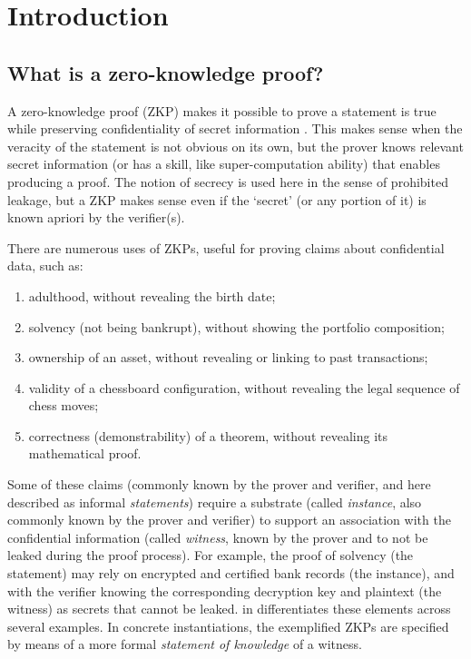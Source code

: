 \section{Introduction}
\label{security:intro}

\subsection{What is a zero-knowledge proof?}
\label{security:intro:what-is-a-ZK}

A zero-knowledge proof (ZKP) makes it possible to prove a statement is true while preserving confidentiality of secret information \cite{1985:GMR:STOC:the-knowledge-complexity-of-interactive-proof-systems}.
This makes sense when the veracity of the statement is not obvious on its own, but the prover knows relevant secret information (or has a skill, like super-computation ability) that enables producing a proof.
The notion of secrecy is used here in the sense of prohibited leakage, but a ZKP makes sense even if the `secret' (or any portion of it) is known apriori by the verifier(s).


There are numerous uses of ZKPs, useful for proving claims about confidential data, such as:
\begin{enumerate}
\item adulthood, without revealing the birth date;
\item solvency (not being bankrupt), without showing the portfolio composition;
\item ownership of an asset, without revealing or linking to past transactions;
\item validity of a chessboard configuration, without revealing the legal sequence of chess moves;
\item correctness (demonstrability) of a theorem, without revealing its mathematical proof.
\end{enumerate}

Some of these claims (commonly known by the prover and verifier, and here described as informal \emph{statements}) require a substrate (called \emph{instance}, also commonly known by the prover and verifier) to support an association with the confidential information (called \emph{witness}, known by the prover and to not be leaked during the proof process).
For example, the proof of solvency (the statement) may rely on encrypted and certified bank records (the instance), and with the verifier knowing the corresponding decryption key and plaintext (the witness) as secrets that cannot be leaked.
 in  differentiates these elements across several examples.
In concrete instantiations, the exemplified ZKPs are specified by means of a more formal \emph{statement of knowledge} of a witness.


